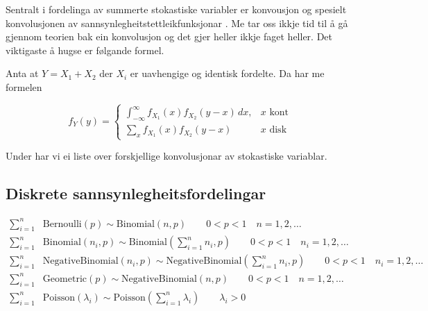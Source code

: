 Sentralt i fordelinga av summerte stokastiske variabler er konvousjon \cite{wiki:conv} og spesielt konvolusjonen av sannsynlegheitstettleikfunksjonar \cite{wiki:convprob}. Me tar oss ikkje tid til å gå gjennom teorien bak ein konvolusjon og det gjer heller ikkje faget heller. Det viktigaste å hugse er følgande formel.

Anta at $Y = X_1 + X_2$ der $X_i$ er uavhengige og identisk fordelte. Da har me formelen

\begin{equation}
    f_Y(y) = 
    \begin{cases}
        \int_{-\infty}^{\infty} f_{X_1}(x)f_{X_2}(y - x) \,dx, & x \text{ kont} \\
        \sum_{x} f_{X_1}(x)f_{X_2}(y-x) & x \text{ disk}
    \end{cases}
\end{equation}

Under har vi ei liste over forskjellige konvolusjonar av stokastiske variablar.

\subsection{Diskrete sannsynlegheitsfordelingar}

\begin{equation}
\begin{split}
\sum_{i=1}^n & \mathrm{Bernoulli}(p) \sim \mathrm{Binomial}(n,p) \qquad 0<p<1 \quad n=1,2,\dots \\
\sum_{i=1}^n & \mathrm{Binomial}(n_i,p) \sim \mathrm{Binomial}\left(\sum_{i=1}^n n_i,p\right) \qquad 0<p<1 \quad  n_i=1,2,\dots \\
\sum_{i=1}^n & \mathrm{NegativeBinomial}(n_i,p)  \sim \mathrm{NegativeBinomial}\left(\sum_{i=1}^n n_i,p\right) \qquad 0<p<1 \quad n_i=1,2,\dots  \\
\sum_{i=1}^n & \mathrm{Geometric}(p)  \sim \mathrm{NegativeBinomial}(n,p) \qquad 0<p<1 \quad n=1,2,\dots \\
\sum_{i=1}^n & \mathrm{Poisson}(\lambda_i) \sim \mathrm{Poisson}\left(\sum_{i=1}^n \lambda_i\right) \qquad \lambda_i>0
\end{split}
\end{equation}


